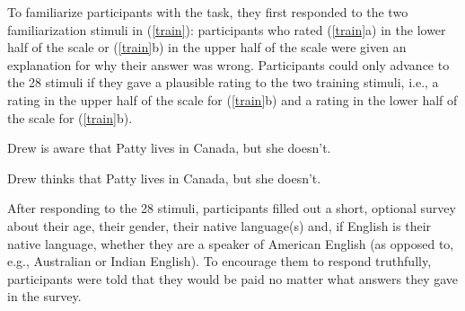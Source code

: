 \documentclass[11pt,fleqn]{article}
\newcommand{\6}{\mbox{$[\hspace*{-.6mm}[$}}
\newcommand{\9}{\mbox{$]\hspace*{-.6mm}]$}}
\begin{document}
{To familiarize participants with the task, they first responded to the two familiarization stimuli in (\ref{train}): participants who rated (\ref{train}a) in the lower half of the scale or (\ref{train}b) in the upper half of the scale were given an explanation for why their answer was wrong. Participants could only advance to the 28 stimuli if they gave a plausible rating to the two training stimuli, i.e., a rating in the upper half of the scale for (\ref{train}b) and a rating in the lower half of the scale for (\ref{train}b).

\begin{exe}
\ex\label{train}
\begin{xlist}
\ex Drew is aware that Patty lives in Canada, but she doesn't.

\ex Drew thinks that Patty lives in Canada, but she doesn't.
\end{xlist}
\end{exe}

After responding to the 28 stimuli, participants filled out a short, optional survey about their age, their gender, their native language(s) and, if English is their native language, whether they are a speaker of American English (as opposed to, e.g., Australian or Indian English). To encourage them to respond truthfully, participants were told that they would be paid no matter what answers they gave in the survey.

}
\end{document}
